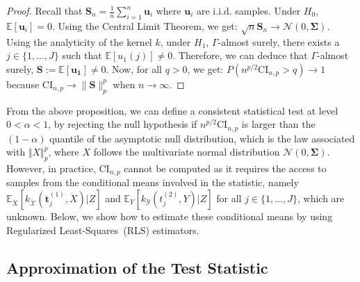 \begin{proof}
Recall that $\mathbf{S}_n = \frac1n\sum_{i=1}^n\mathbf{u}_i$ where $\mathbf{u}_i$ are i.i.d. samples.  Under $H_0$, $\mathbb{E}\left[\mathbf{u}_i\right]=0$. Using the Central Limit Theorem, we get: $\sqrt{n}\mathbf{S}_n\to\mathcal{N}(0,\bm{\Sigma})$. Using the analyticity of the kernel $k$, under $H_1$, $\Gamma$-almost surely, there exists a $j\in\{1,\dots,J\}$ such that $\mathbb{E}\left[u_1(j)\right]\neq 0$. Therefore, we can deduce that $\Gamma$-almost surely, $\mathbf{S}:=\mathbb{E}\left[\mathbf{u_1}\right]\neq 0$. Now, for all $q>0$, we get: $P(n^{p/2}\text{CI}_{n,p}>q)\to 1$ because $\text{CI}_{n,p}\to\lVert\mathbf{S}\rVert_p^p $  when $n\to\infty$.
\end{proof}

From the above proposition, we can define a consistent statistical test at level $0<\alpha<1$, by rejecting the null hypothesis if $n^{p/2}\text{CI}_{n,p}$ is larger than the $(1-\alpha)$ quantile of the asymptotic null distribution, which is the law associated with $\Vert X\Vert_p^p$, where $X$ follows the multivariate normal distribution $\mathcal{N}(0,\bm{\Sigma})$. However, in practice, $\text{CI}_{n,p}$ cannot be computed as it requires the access to samples from the conditional means involved in the statistic, namely $\mathbb{E}_{\ddot{X}}\left[k_{\mathcal{\ddot{X}}}(\mathbf{t}^{(1)}_j,\ddot{X})|Z\right]$ and $\mathbb{E}_{Y}\left[k_{\mathcal{Y}}(t^{(2)}_j,Y)|Z\right]$ for all $j\in\{1,\dots,J\}$, which are unknown. Below, we show how to estimate these conditional means by using Regularized Least-Squares~(RLS) estimators. 



\subsection{Approximation of the Test Statistic}
 
